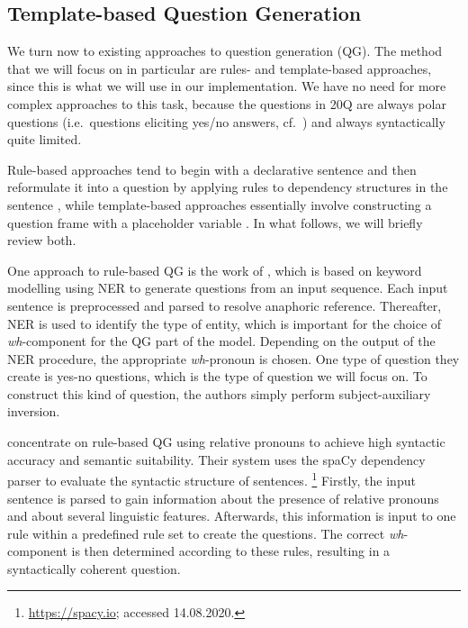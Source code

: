\documentclass[11pt,a4paper]{article}
\begin{document}
\subsection{Template-based Question Generation}
\label{subsec:qglit}

We turn now to existing approaches to question generation (QG).
The method that we will focus on in particular are rules- and template-based approaches, since this is what we will use in our implementation.
We have no need for more complex approaches to this task, because the questions in 20Q are always polar questions (i.e.\ questions eliciting yes/no answers, cf.\ \citealt{Huddleston1994}) and always syntactically quite limited.

Rule-based approaches tend to begin with a declarative sentence and then reformulate it into a question by applying rules to dependency structures in the sentence \citep[e.g.][]{KhullarEa2018, MhatreEa2019}, while template-based approaches essentially involve constructing a question frame with a placeholder variable \citep[e.g.][]{Zerr2014, Mandasari2019, FabbriEa2020}. 
In what follows, we will briefly review both.

One approach to rule-based QG is the work of \citet{MhatreEa2019}, which is based on keyword modelling using NER to generate questions from an input sequence. 
Each input sentence is preprocessed and parsed to resolve anaphoric reference. 
Thereafter, NER is used to identify the type of entity, which is important for the choice of \textit{wh}-component for the QG part of the model. 
Depending on the output of the NER procedure, the appropriate \textit{wh}-pronoun is chosen. 
One type of question they create is yes-no questions, which is the type of question we will focus on.
To construct this kind of question, the authors simply perform subject-auxiliary inversion. 

\citet{KhullarEa2018} concentrate on rule-based QG using relative pronouns to achieve high syntactic accuracy and semantic suitability. 
Their system uses the spaCy dependency parser to evaluate the syntactic structure of sentences.%
	\footnote{\url{https://spacy.io}; accessed 14.08.2020.}
Firstly, the input sentence is parsed to gain information about the presence of relative pronouns and about several linguistic features. 
Afterwards, this information is input to one rule within a predefined rule set to create the questions. 
The correct \textit{wh}-component is then determined according to these rules, resulting in a syntactically coherent question. 
\end{document}
